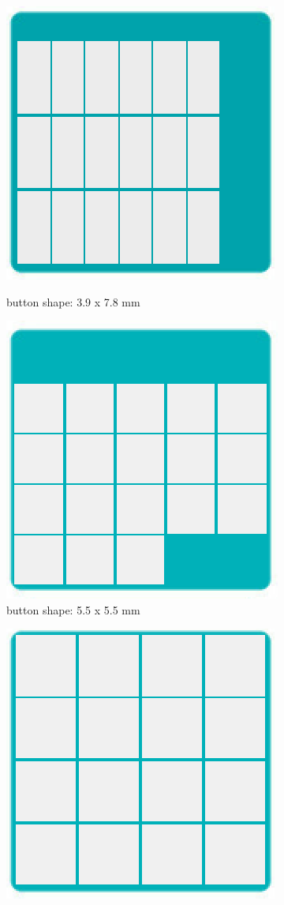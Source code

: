 \begin{figure}
\begin{subfigure}{.24\textwidth}
  \centering
  \includegraphics[width=.7\linewidth]{figures/F3-1.png}
  \caption{button shape: 3.9 x 7.8 mm}
  \label{fig:f3a}
  \includegraphics[width=.7\linewidth]{figures/F3-2.png}
  \caption{button shape: 5.5 x 5.5 mm}
  \label{fig:f3b}
\end{subfigure}%
\begin{subfigure}{.24\textwidth}
  \centering
  \includegraphics[width=.7\linewidth]{figures/F3-3.png}

\end{subfigure}
\end{figure}
